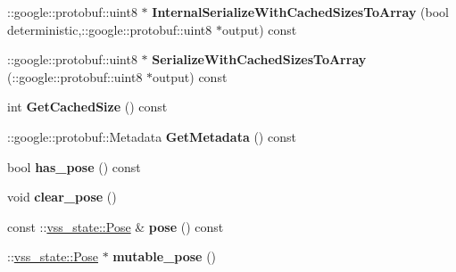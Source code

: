 \begin{DoxyCompactItemize}
\item 
\+::google\+::protobuf\+::uint8 $\ast$ {\bfseries Internal\+Serialize\+With\+Cached\+Sizes\+To\+Array} (bool deterministic,\+::google\+::protobuf\+::uint8 $\ast$output) const \hypertarget{classvss__state_1_1Ball__State_ab4cba5d600b6ca3e6302ee7aaaa1c364}{}\label{classvss__state_1_1Ball__State_ab4cba5d600b6ca3e6302ee7aaaa1c364}

\item 
\+::google\+::protobuf\+::uint8 $\ast$ {\bfseries Serialize\+With\+Cached\+Sizes\+To\+Array} (\+::google\+::protobuf\+::uint8 $\ast$output) const \hypertarget{classvss__state_1_1Ball__State_a364e073f9074db05786bd455d88cdf6a}{}\label{classvss__state_1_1Ball__State_a364e073f9074db05786bd455d88cdf6a}

\item 
int {\bfseries Get\+Cached\+Size} () const \hypertarget{classvss__state_1_1Ball__State_a7f1be4451c61efb737a23f36191592f5}{}\label{classvss__state_1_1Ball__State_a7f1be4451c61efb737a23f36191592f5}

\item 
\+::google\+::protobuf\+::\+Metadata {\bfseries Get\+Metadata} () const \hypertarget{classvss__state_1_1Ball__State_ab93a553faefe3d3c98f56f6f84df0892}{}\label{classvss__state_1_1Ball__State_ab93a553faefe3d3c98f56f6f84df0892}

\item 
bool {\bfseries has\+\_\+pose} () const \hypertarget{classvss__state_1_1Ball__State_aeba993e45c63156eeb1b202c4e439559}{}\label{classvss__state_1_1Ball__State_aeba993e45c63156eeb1b202c4e439559}

\item 
void {\bfseries clear\+\_\+pose} ()\hypertarget{classvss__state_1_1Ball__State_aae55355551b9800c9a9f5b3b21fd6621}{}\label{classvss__state_1_1Ball__State_aae55355551b9800c9a9f5b3b21fd6621}

\item 
const \+::\hyperlink{classvss__state_1_1Pose}{vss\+\_\+state\+::\+Pose} \& {\bfseries pose} () const \hypertarget{classvss__state_1_1Ball__State_a2e0c721ce0540088e6015dcabc56c483}{}\label{classvss__state_1_1Ball__State_a2e0c721ce0540088e6015dcabc56c483}

\item 
\+::\hyperlink{classvss__state_1_1Pose}{vss\+\_\+state\+::\+Pose} $\ast$ {\bfseries mutable\+\_\+pose} ()\hypertarget{classvss__state_1_1Ball__State_a4c639ae56018c9b8bb3bd857565b9151}{}\label{classvss__state_1_1Ball__State_a4c639ae56018c9b8bb3bd857565b9151}


\end{DoxyCompactItemize}
